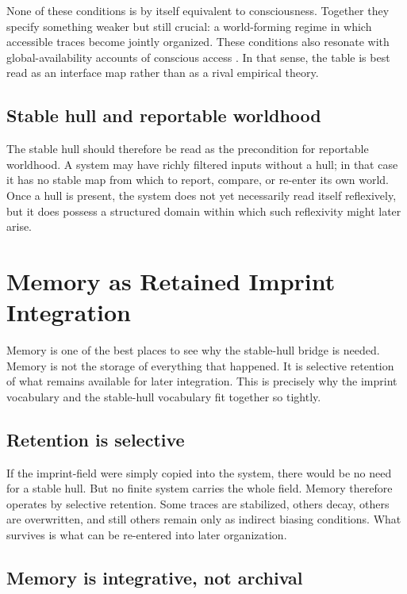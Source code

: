 \documentclass[12pt]{article}
\begin{document}
None of these conditions is by itself equivalent to consciousness. Together they specify something weaker but still crucial: a world-forming regime in which accessible traces become jointly organized. These conditions also resonate with global-availability accounts of conscious access \cite{Baars1988,DehaeneChangeux2011}. In that sense, the table is best read as an interface map rather than as a rival empirical theory.

\subsection{Stable hull and reportable worldhood}

The stable hull should therefore be read as the precondition for reportable worldhood. A system may have richly filtered inputs without a hull; in that case it has no stable map from which to report, compare, or re-enter its own world. Once a hull is present, the system does not yet necessarily read itself reflexively, but it does possess a structured domain within which such reflexivity might later arise.

\section{Memory as Retained Imprint Integration}

Memory is one of the best places to see why the stable-hull bridge is needed. Memory is not the storage of everything that happened. It is selective retention of what remains available for later integration. This is precisely why the imprint vocabulary and the stable-hull vocabulary fit together so tightly.

\subsection{Retention is selective}

If the imprint-field were simply copied into the system, there would be no need for a stable hull. But no finite system carries the whole field. Memory therefore operates by selective retention. Some traces are stabilized, others decay, others are overwritten, and still others remain only as indirect biasing conditions. What survives is what can be re-entered into later organization.

\subsection{Memory is integrative, not archival}
\end{document}
